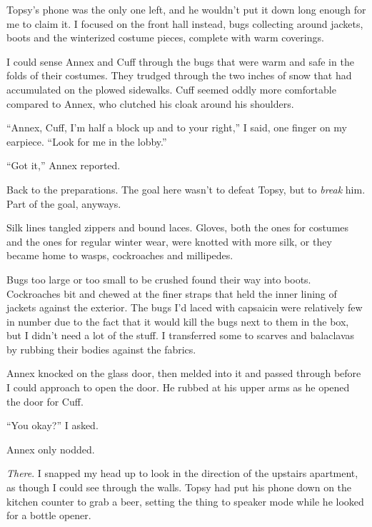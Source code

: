 Topsy's phone was the only one left, and he wouldn't put it down long enough for me to claim it.  I focused on the front hall instead, bugs collecting around jackets, boots and the winterized costume pieces, complete with warm coverings.



I could sense Annex and Cuff through the bugs that were warm and safe in the folds of their costumes.  They trudged through the two inches of snow that had accumulated on the plowed sidewalks.  Cuff seemed oddly more comfortable compared to Annex, who clutched his cloak around his shoulders.



``Annex, Cuff, I'm half a block up and to your right,'' I said, one finger on my earpiece.  ``Look for me in the lobby.''



``Got it,'' Annex reported.



Back to the preparations.  The goal here wasn't to defeat Topsy, but to \emph{break} him.  Part of the goal, anyways.



Silk lines tangled zippers and bound laces.  Gloves, both the ones for costumes and the ones for regular winter wear, were knotted with more silk, or they became home to wasps, cockroaches and millipedes.



Bugs too large or too small to be crushed found their way into boots.  Cockroaches bit and chewed at the finer straps that held the inner lining of jackets against the exterior.  The bugs I'd laced with capsaicin were relatively few in number due to the fact that it would kill the bugs next to them in the box, but I didn't need a lot of the stuff.  I transferred some to scarves and balaclavas by rubbing their bodies against the fabrics.



Annex knocked on the glass door, then melded into it and passed through before I could approach to open the door.  He rubbed at his upper arms as he opened the door for Cuff.



``You okay?'' I asked.



Annex only nodded.



\emph{There}.  I snapped my head up to look in the direction of the upstairs apartment, as though I could see through the walls.  Topsy had put his phone down on the kitchen counter to grab a beer, setting the thing to speaker mode while he looked for a bottle opener.



